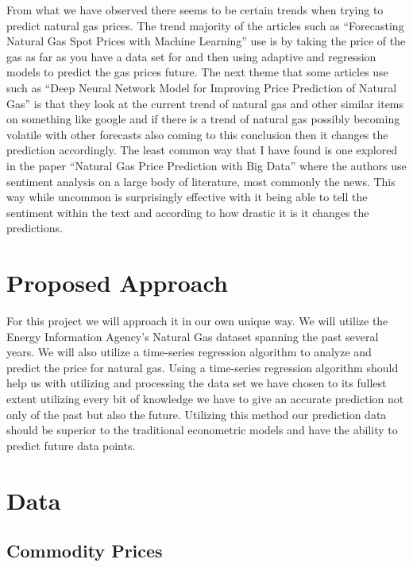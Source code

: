 \documentclass[final]{cvpr}
\begin{document}
    From what we have observed there seems to be certain trends when trying to
    predict natural gas prices. The trend majority of the articles such as
    “Forecasting Natural Gas Spot Prices with Machine Learning” use is by taking
    the price of the gas as far as you have a data set for and then using
    adaptive and regression models to predict the gas prices future. The next
    theme that some articles use such as “Deep Neural Network Model for
    Improving Price Prediction of Natural Gas” is that they look at the current
    trend of natural gas and other similar items on something like google and if
    there is a trend of natural gas possibly becoming volatile with other
    forecasts also coming to this conclusion then it changes the prediction
    accordingly. The least common way that I have found is one explored in the
    paper “Natural Gas Price Prediction with Big Data” where the authors use
    sentiment analysis on a large body of literature, most commonly the news.
    This way while uncommon is surprisingly effective with it being able to tell
    the sentiment within the text and according to how drastic it is it changes
    the predictions.

\section{Proposed Approach}

    For this project we will approach it in our own unique way. We will utilize
    the Energy Information Agency's Natural Gas dataset spanning the past
    several years. We will also utilize a time-series regression algorithm to
    analyze and predict the price for natural gas. Using a time-series
    regression algorithm should help us with utilizing and processing the data
    set we have chosen to its fullest extent utilizing every bit of knowledge we
    have to give an accurate prediction not only of the past but also the
    future. Utilizing this method our prediction data should be superior to the
    traditional econometric models and have the ability to predict future data
    points.

\section{Data}

\subsection{Commodity Prices}
\end{document}
